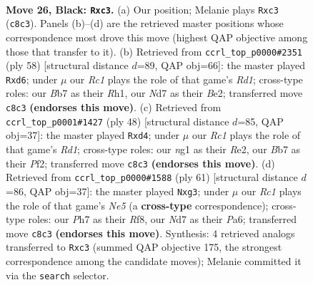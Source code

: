 \documentclass[11pt]{article}
\begin{document}
\clearpage

\begin{figure}[p]\centering
\begin{subfigure}{0.46\textwidth}\centering
\resizebox{\linewidth}{!}{%
\newchessgame
\chessboard[
  setfen={2r4k/1b1n1p1p/5rp1/pp1Pp3/4P3/1PQ3P1/5P1P/R3K1NR b - - 0 26},
  showmover=false,
  pgfstyle=straightmove, color=movearrow, markmove={c8-c3}
]}
\caption{}
\end{subfigure}\hfill
\begin{subfigure}{0.46\textwidth}\centering
\resizebox{\linewidth}{!}{%
\newchessgame
\chessboard[
  setfen={4bk2/2r3p1/3qpp1r/p6P/1pP1PP2/8/PP2B3/K2R3R w - - 0 30},
  showmover=false,
  pgfstyle=straightmove, color=movearrow, markmove={d1-d6}
]}
\caption{}
\end{subfigure}
\\[4pt]
\begin{subfigure}{0.46\textwidth}\centering
\resizebox{\linewidth}{!}{%
\newchessgame
\chessboard[
  setfen={r3r3/1p2P1kp/2pp2p1/pB3p2/3q4/P7/1P2RPPP/2KR4 w - - 0 25},
  showmover=false,
  pgfstyle=straightmove, color=movearrow, markmove={d1-d4}
]}
\caption{}
\end{subfigure}\hfill
\begin{subfigure}{0.46\textwidth}\centering
\resizebox{\linewidth}{!}{%
\newchessgame
\chessboard[
  setfen={5rk1/5pp1/p7/p3pP1p/P2pn2P/1PrN2Q1/2P4K/3R1R2 b - - 0 31},
  showmover=false,
  pgfstyle=straightmove, color=movearrow, markmove={e4-g3}
]}
\caption{}
\end{subfigure}
\caption{\textbf{Move 26, Black: \texttt{Rxc3}.} (a) Our position; Melanie plays \texttt{Rxc3} (\texttt{c8c3}). Panels (b)--(d) are the retrieved master positions whose correspondence most drove this move (highest QAP objective among those that transfer to it). (b) Retrieved from \texttt{ccrl\_top\_p0000\#2351} (ply 58) [structural distance $d$=89, QAP obj=66]: the master played \texttt{Rxd6}; under $\mu$ our \emph{Rc1} plays the role of that game's \emph{Rd1}; cross-type roles: our \emph{B}b7 as their \emph{R}h1, our \emph{N}d7 as their \emph{B}e2; transferred move \texttt{c8c3} \textbf{(endorses this move)}. (c) Retrieved from \texttt{ccrl\_top\_p0001\#1427} (ply 48) [structural distance $d$=85, QAP obj=37]: the master played \texttt{Rxd4}; under $\mu$ our \emph{Rc1} plays the role of that game's \emph{Rd1}; cross-type roles: our \emph{n}g1 as their \emph{R}e2, our \emph{B}b7 as their \emph{P}f2; transferred move \texttt{c8c3} \textbf{(endorses this move)}. (d) Retrieved from \texttt{ccrl\_top\_p0000\#1588} (ply 61) [structural distance $d$=86, QAP obj=37]: the master played \texttt{Nxg3}; under $\mu$ our \emph{Rc1} plays the role of that game's \emph{Ne5} (a \textbf{cross-type} correspondence); cross-type roles: our \emph{P}h7 as their \emph{R}f8, our \emph{N}d7 as their \emph{P}a6; transferred move \texttt{c8c3} \textbf{(endorses this move)}. Synthesis: 4 retrieved analogs transferred to \texttt{Rxc3} (summed QAP objective 175, the strongest correspondence among the candidate moves); Melanie committed it via the \texttt{search} selector.}
\label{fig:thought-m51}
\end{figure}
\end{document}
